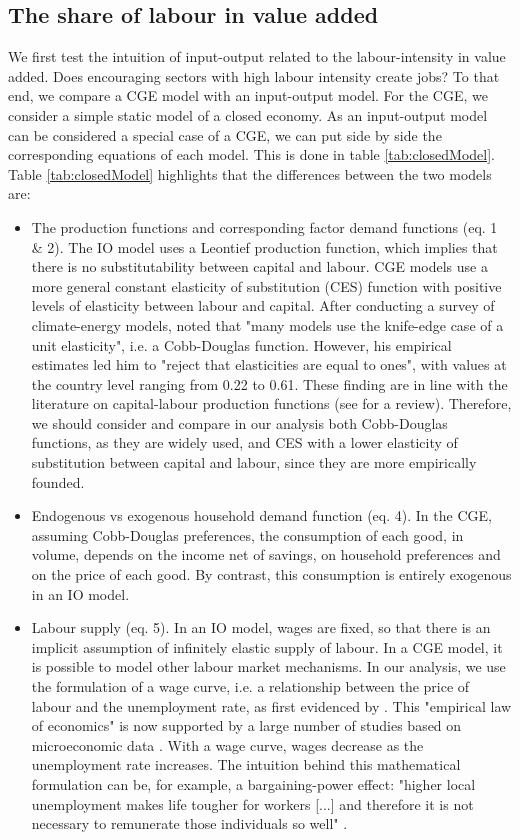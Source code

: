 \subsection{The share of labour in value added} \label{subsec:labourShare}
We first test the intuition of input-output related to the labour-intensity in value added. Does encouraging sectors with high labour intensity create jobs? 
To that end, we compare a CGE model with an input-output model.
For the CGE, we consider a simple static model of a closed economy. 
As an input-output model can be considered a special case of a CGE, we can put side by side the corresponding equations of each model. This is done in table \ref{tab:closedModel}. Table \ref{tab:closedModel} highlights that the differences between the two models are:
\begin{itemize}
	\item The production functions and corresponding factor demand functions (eq. 1 \& 2). The IO model uses a Leontief production function, which implies that there is no substitutability between capital and labour. CGE models use a more general constant elasticity of substitution (CES) function with positive levels of elasticity between labour and capital. After conducting a survey of climate-energy models, \citet{VanderWerf2008} noted that "many models use the knife-edge case of a unit elasticity", i.e. a Cobb-Douglas function. However, his empirical estimates led him to "reject	that elasticities are equal to ones", with values at the country level ranging from 0.22 to 0.61. These finding are in line with the literature on capital-labour production functions (see \citet{Antras2004} for a review). Therefore, we should consider and compare in our analysis both Cobb-Douglas functions, as they are widely used, and CES with a lower elasticity of substitution between capital and labour, since they are more empirically founded.
	\item Endogenous vs exogenous household demand function (eq. 4). In the CGE, assuming Cobb-Douglas preferences, the consumption of each good, in volume, depends on the income net of savings, on household preferences and on the price of each good. By contrast, this consumption is entirely exogenous in an IO model. 
	\item Labour supply (eq. 5). In an IO model, wages are fixed, so that there is an implicit assumption of infinitely elastic supply of labour. In a CGE model, it is possible to model other labour market mechanisms. In our analysis, we use the formulation of a wage curve, i.e. a relationship between the price of labour and the unemployment rate, as first evidenced by \citet{Blanchflower1995}. This "empirical law of economics" is now supported by a large number of studies based on microeconomic data \citep{Blanchflower2005}. With a wage curve, wages decrease as the unemployment rate increases. The intuition behind this mathematical formulation can be, for example, a bargaining-power effect: "higher local unemployment makes life tougher for workers [...] and therefore it is not necessary to remunerate those individuals so well" \citep{Blanchflower2005}. 

\end{itemize}
